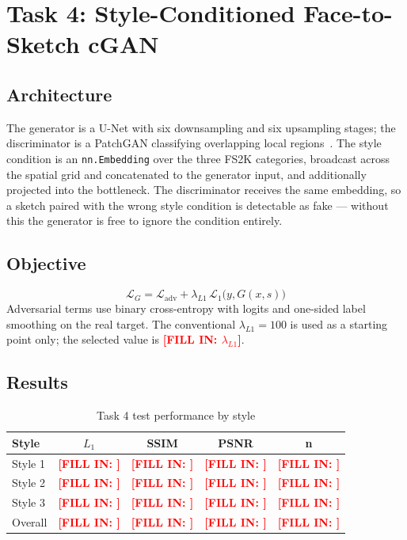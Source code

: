 \documentclass[conference]{IEEEtran}
\newcommand{\PLACEHOLDER}[1]{\textcolor{red}{\textbf{[FILL IN: #1]}}}
\begin{document}
\section{Task 4: Style-Conditioned Face-to-Sketch cGAN}
\subsection{Architecture}
The generator is a U-Net with six downsampling and six upsampling stages; the
discriminator is a PatchGAN classifying overlapping local
regions~\cite{isola2017}. The style condition is an \texttt{nn.Embedding} over
the three FS2K categories, broadcast across the spatial grid and concatenated
to the generator input, and additionally projected into the bottleneck. The
discriminator receives the same embedding, so a sketch paired with the wrong
style condition is detectable as fake --- without this the generator is free to
ignore the condition entirely.

\subsection{Objective}
\begin{equation}
\mathcal{L}_G = \mathcal{L}_{\text{adv}}
  + \lambda_{L1}\,\mathcal{L}_{1}\bigl(y, G(x, s)\bigr)
\end{equation}
Adversarial terms use binary cross-entropy with logits and one-sided label
smoothing on the real target. The conventional $\lambda_{L1}=100$ is used as a
starting point only; the selected value is \PLACEHOLDER{$\lambda_{L1}$}.

\subsection{Results}
\begin{table}[t]
\caption{Task 4 test performance by style}
\label{tab:task4}
\centering
\begin{tabular}{@{}lcccc@{}}
\toprule
\textbf{Style} & \textbf{$L_1$} & \textbf{SSIM} & \textbf{PSNR} & \textbf{n} \\
\midrule
Style 1 & \PLACEHOLDER{} & \PLACEHOLDER{} & \PLACEHOLDER{} & \PLACEHOLDER{} \\
Style 2 & \PLACEHOLDER{} & \PLACEHOLDER{} & \PLACEHOLDER{} & \PLACEHOLDER{} \\
Style 3 & \PLACEHOLDER{} & \PLACEHOLDER{} & \PLACEHOLDER{} & \PLACEHOLDER{} \\
Overall & \PLACEHOLDER{} & \PLACEHOLDER{} & \PLACEHOLDER{} & \PLACEHOLDER{} \\
\bottomrule
\end{tabular}
\end{table}
\end{document}
